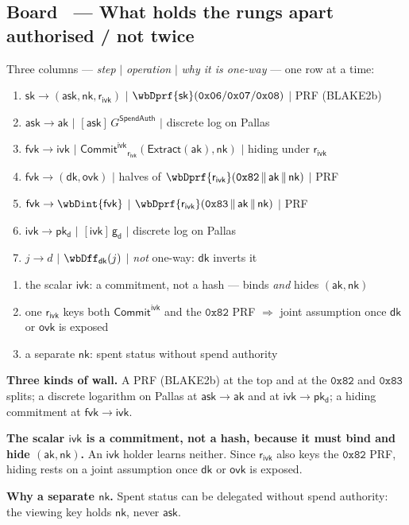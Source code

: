 \documentclass[11pt,a4paper]{article}
\makeatletter
\newcommand{\gd}{\ensuremath{\mathsf{g_d}}}
\newcommand{\pkd}{\ensuremath{\mathsf{pk_d}}}
\newcommand{\aksym}{\ensuremath{\mathsf{ak}}}
\newcommand{\nksym}{\ensuremath{\mathsf{nk}}}
\newcommand{\asksym}{\ensuremath{\mathsf{ask}}}
\newcommand{\ivk}{\ensuremath{\mathsf{ivk}}}
\newcommand{\fvk}{\ensuremath{\mathsf{fvk}}}
\newcommand{\ovk}{\ensuremath{\mathsf{ovk}}}
\newcommand{\dk}{\ensuremath{\mathsf{dk}}}
\newcommand{\rivk}{\ensuremath{\mathsf{r_{ivk}}}}
\newcommand{\Extract}{\ensuremath{\mathsf{Extract}}}
\newcommand{\CommitIvk}{\ensuremath{\mathsf{Commit}^{\mathsf{ivk}}}}
\newcounter{board}
\newenvironment{board}[2]{\stepcounter{board}%
  \subsection*{Board \theboard\ --- #1 \hfill {\normalfont\small\color{arb}#2}}}{\medskip}
\newcommand{\Draw}{\draw@head{Draw}}
\newcommand{\Write}{\draw@head{Write}}
\newcommand{\Say}{\draw@head{Say}}
\makeatother
\begin{document}
\begin{board}{What holds the rungs apart}{authorised / not twice}
\Draw
Three columns --- \emph{step} $\mid$ \emph{operation} $\mid$ \emph{why it
is one-way} --- one row at a time:
\begin{enumerate}
  \item $\mathsf{sk} \to (\asksym, \nksym, \rivk)$ $\mid$
    $\wbDprf{\mathsf{sk}}(\mathtt{0x06}/\mathtt{0x07}/\mathtt{0x08})$
    $\mid$ PRF (BLAKE2b)
  \item $\asksym \to \aksym$ $\mid$ $[\asksym]\,G^{\mathsf{SpendAuth}}$
    $\mid$ discrete log on Pallas
  \item $\fvk \to \ivk$ $\mid$ $\CommitIvk_{\rivk}(\Extract(\aksym),
    \nksym)$ $\mid$ hiding under \rivk
  \item $\fvk \to (\dk, \ovk)$ $\mid$ halves of
    $\wbDprf{\rivk}(\mathtt{0x82}\,\|\,\aksym\,\|\,\nksym)$ $\mid$ PRF
  \item $\fvk \to \wbDint{\fvk}$ $\mid$
    $\wbDprf{\rivk}(\mathtt{0x83}\,\|\,\aksym\,\|\,\nksym)$ $\mid$ PRF
  \item $\ivk \to \pkd$ $\mid$ $[\ivk]\,\gd$ $\mid$ discrete log on Pallas
  \item $j \to d$ $\mid$ $\wbDff_{\dk}(j)$ $\mid$ \emph{not} one-way:
    \dk{} inverts it
\end{enumerate}
\Write
\begin{enumerate}
  \item the scalar \ivk: a commitment, not a hash --- binds \emph{and}
    hides $(\aksym, \nksym)$
  \item one \rivk{} keys both $\CommitIvk$ and the $\mathtt{0x82}$ PRF
    $\Rightarrow$ joint assumption once \dk{} or \ovk{} is exposed
  \item a separate \nksym: spent status without spend authority
\end{enumerate}
\Say
\textbf{Three kinds of wall.} A PRF (BLAKE2b) at the top and at the
$\mathtt{0x82}$ and $\mathtt{0x83}$ splits; a discrete logarithm on
Pallas at $\asksym \to \aksym$ and at $\ivk \to \pkd$; a hiding
commitment at $\fvk \to \ivk$.

\textbf{The scalar \ivk{} is a commitment, not a hash, because it must
bind and hide $(\aksym, \nksym)$.} An \ivk{} holder learns neither. Since
\rivk{} also keys the $\mathtt{0x82}$ PRF, hiding rests on a joint
assumption once \dk{} or \ovk{} is exposed.

\textbf{Why a separate \nksym.} Spent status can be delegated without
spend authority: the viewing key holds \nksym, never \asksym.


\end{board}
\end{document}
